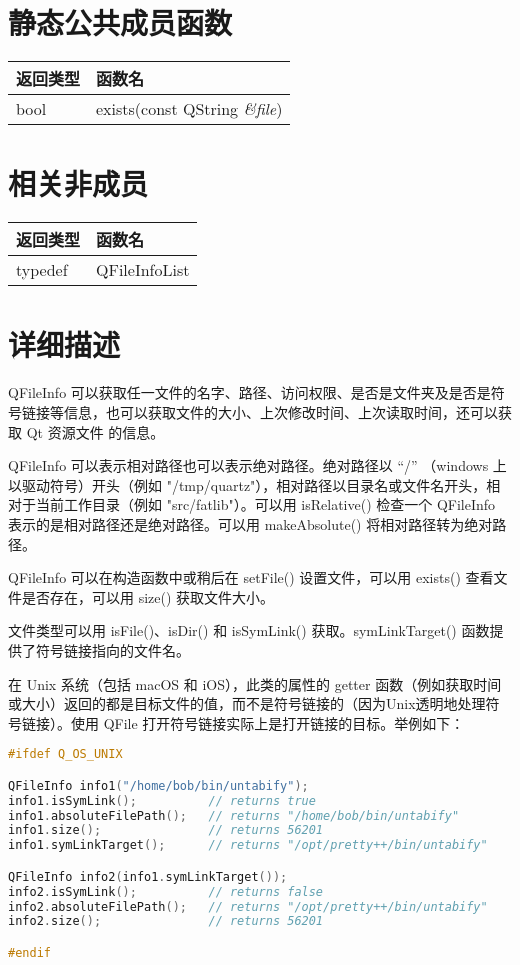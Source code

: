 \section{静态公共成员函数}

\begin{tabular}{|l|l|}
\hline
返回类型 &	函数名\\
\hline
bool &	exists(const QString \emph{\&file})\\
\hline
\end{tabular}


\section{相关非成员}

\begin{tabular}{|l|l|}
\hline
返回类型& 	函数名\\
\hline
typedef &	QFileInfoList\\
\hline
\end{tabular}

\splitLine 

\section{详细描述}

QFileInfo 可以获取任一文件的名字、路径、访问权限、是否是文件夹及是否是符号链接等信息，也可以获取文件的大小、上次修改时间、上次读取时间，还可以获取 Qt 资源文件 的信息。

QFileInfo 可以表示相对路径也可以表示绝对路径。绝对路径以 “/” （windows 上以驱动符号）开头（例如 "/tmp/quartz"），相对路径以目录名或文件名开头，相对于当前工作目录（例如 "src/fatlib"）。可以用 isRelative() 检查一个 QFileInfo 表示的是相对路径还是绝对路径。可以用 makeAbsolute() 将相对路径转为绝对路径。

QFileInfo 可以在构造函数中或稍后在 setFile() 设置文件，可以用 exists() 查看文件是否存在，可以用 size() 获取文件大小。

文件类型可以用 isFile()、isDir() 和 isSymLink() 获取。symLinkTarget() 函数提供了符号链接指向的文件名。

在 Unix 系统（包括 macOS 和 iOS），此类的属性的 getter 函数（例如获取时间或大小）返回的都是目标文件的值，而不是符号链接的（因为Unix透明地处理符号链接）。使用 QFile 打开符号链接实际上是打开链接的目标。举例如下：


\begin{lstlisting}[language=C++]
#ifdef Q_OS_UNIX

QFileInfo info1("/home/bob/bin/untabify");
info1.isSymLink();          // returns true
info1.absoluteFilePath();   // returns "/home/bob/bin/untabify"
info1.size();               // returns 56201
info1.symLinkTarget();      // returns "/opt/pretty++/bin/untabify"

QFileInfo info2(info1.symLinkTarget());
info2.isSymLink();          // returns false
info2.absoluteFilePath();   // returns "/opt/pretty++/bin/untabify"
info2.size();               // returns 56201

#endif
\end{lstlisting}

